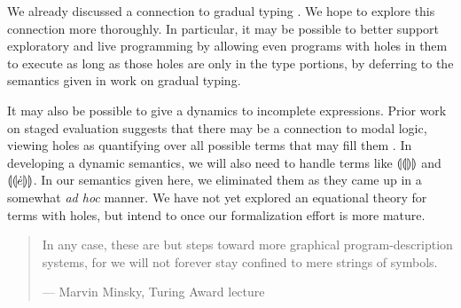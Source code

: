 \documentclass[preprint,9pt]{sigplanconf}
\begin{document}
We already discussed a connection to gradual typing \cite{Siek06a}. We hope to explore this connection more thoroughly. In particular, it may be possible to better support exploratory and live programming by allowing even programs with holes in them to execute as long as those holes are only in the type portions, by deferring to the semantics given in work on gradual typing.

It may also be possible to give a dynamics to incomplete expressions. Prior work on staged evaluation suggests that there may be a connection to modal logic, viewing holes as quantifying over all possible terms that may fill them \cite{DBLP:journals/jacm/DaviesP01}. In developing a dynamic semantics, we will also need to handle terms like $\llparenthesis\llparenthesis\rrparenthesis\rrparenthesis$ and
$\llparenthesis\llparenthesis\dot{e}\rrparenthesis\rrparenthesis$. In our semantics given here, we eliminated them as they came up in a somewhat \emph{ad hoc} manner. We have not yet
explored an equational theory for terms with holes, but intend to once our
formalization effort is more mature.


\begin{quote}
In any case, these are but steps toward more graphical program-description
systems, for we will not forever stay confined to mere strings of symbols.

--- Marvin Minsky, Turing Award lecture
\end{quote}%
\clearpage




\end{document}
